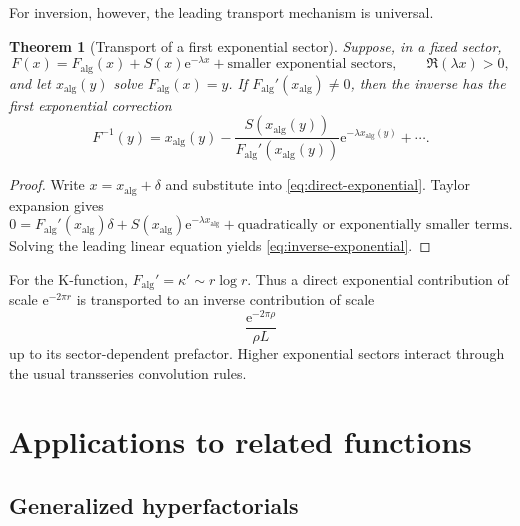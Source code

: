\documentclass[11pt,a4paper]{article}
\numberwithin{equation}{section}
\newtheorem{theorem}{Theorem}[section]
\theoremstyle{remark}
\newcommand{\e}{\mathrm e}
\begin{document}
For inversion, however, the leading transport mechanism is universal.

\begin{theorem}[Transport of a first exponential sector]
\label{thm:exponential-transport}
Suppose, in a fixed sector,
\begin{equation}
F(x)=F_{\mathrm{alg}}(x)+
S(x)\e^{-\lambda x}+\text{smaller exponential sectors},
\qquad \Re(\lambda x)>0,
\label{eq:direct-exponential}
\end{equation}
and let \(x_{\mathrm{alg}}(y)\) solve
\(F_{\mathrm{alg}}(x)=y\).  If
\(F_{\mathrm{alg}}'(x_{\mathrm{alg}})\ne0\), then the inverse has the first
exponential correction
\begin{equation}
F^{-1}(y)=x_{\mathrm{alg}}(y)
-\frac{S(x_{\mathrm{alg}}(y))}
{F_{\mathrm{alg}}'(x_{\mathrm{alg}}(y))}
\e^{-\lambda x_{\mathrm{alg}}(y)}
+\cdots.
\label{eq:inverse-exponential}
\end{equation}
\end{theorem}

\begin{proof}
Write \(x=x_{\mathrm{alg}}+\delta\) and substitute into
\cref{eq:direct-exponential}.  Taylor expansion gives
\[
0=F_{\mathrm{alg}}'(x_{\mathrm{alg}})\delta
+S(x_{\mathrm{alg}})\e^{-\lambda x_{\mathrm{alg}}}
+\text{quadratically or exponentially smaller terms}.
\]
Solving the leading linear equation yields \cref{eq:inverse-exponential}.
\end{proof}

For the K-function, \(F_{\mathrm{alg}}'=\kappa'\sim r\log r\).  Thus a
direct exponential contribution of scale \(\e^{-2\pi r}\) is transported to
an inverse contribution of scale
\begin{equation}
\frac{\e^{-2\pi\rho}}{\rho L}
\label{eq:K-exponential-scale}
\end{equation}
up to its sector-dependent prefactor.  Higher exponential sectors interact
through the usual transseries convolution rules.

\section{Applications to related functions}
\label{sec:applications}

\subsection{Generalized hyperfactorials}
\end{document}
